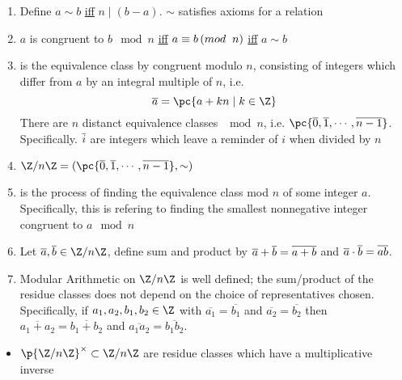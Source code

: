 \documentclass[11pt]{article}
\begin{document}
\newpage
\section{}

\begin{definition*}
    \begin{enumerate}
        \item {} Define $a\sim b$ \underline{iff} $n \mid (b-a)$. $\sim$ satisfies axioms for a relation
        \item {} $a$ is congruent to $b \mod n$ \underline{iff} $a \equiv b \left(mod \;\; n \right)$ \underline{iff} $a\sim b$
        \item {} is the equivalence class by congruent modulo $n$, consisting of integers which differ from $a$ by an integral multiple of $n$, i.e. 
        \[
            \overline{a} = \pc{a+kn \mid k\in \Z}        
        \]
        There are $n$ distanct equivalence classes $\mod n$, i.e. $\pc{\overline{0}, \overline{1}, \cdots, \overline{n-1}}$. Specifically. $\overline{i}$ are integers which leave a reminder of $i$ when divided by $n$
        \item {} $\integermodn = (\pc{\overline{0}, \overline{1}, \cdots, \overline{n-1}}, \sim)$
        \item {} is the process of finding the equivalence class mod $n$ of some integer $a$. Specifically, this is refering to finding the smallest nonnegative integer congruent to $a\mod n$
        \item {} Let $\oa,\ob \in \integermodn$, define sum and product by $\overline{a} + \overline{b} = \overline{a+b}$ and $\overline{a} \cdot \overline{b} = \overline{ab}$.
        \item {} Modular Arithmetic on $\integermodn$ is well defined; the sum/product of the residue classes does not depend on the choice of representatives chosen. Specifically, if $a_1,a_2,b_1,b_2\in \Z$ with $\overline{a_1} = \overline{b_1}$ and $\overline{a_2} = \overline{b_2}$ then $\overline{a_1 + a_2} = \overline{b_1 + b_2}$ and $\overline{a_1 a_2} = \overline{b_1 b_2}$.
    \end{enumerate}
    \begin{itemize}
        \item $\p{\integermodn}^{\times} \subset \integermodn$ are residue classes which have a multiplicative inverse

\end{itemize}
\end{definition*}
\end{document}
